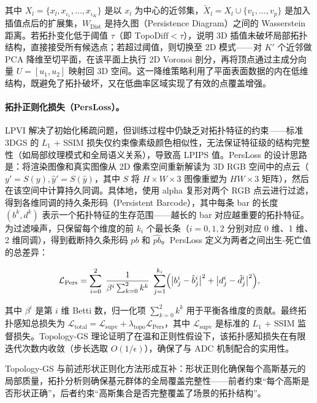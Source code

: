 其中 $X_l = \{x_l, x_{\iota_1}, \ldots, x_{\iota_K}\}$ 是以 $x_l$ 为中心的近邻集，$\tilde{X}_l = X_l \cup \{v_1, \ldots, v_p\}$ 是加入插值点后的扩展集，$W_{\mathrm{Dist}}$ 是持久图（Persistence Diagram）之间的 Wasserstein 距离。若拓扑变化低于阈值 $\tau$（即 $\mathrm{TopoDiff} < \tau$），说明 3D 插值未破坏局部拓扑结构，直接接受所有候选点；若超过阈值，则切换至 2D 模式——对 $K'$ 个近邻做 PCA 降维至切平面，在该平面上执行 2D Voronoi 剖分，再将顶点通过主成分向量 $U = [u_1, u_2]$ 映射回 3D 空间。这一降维策略利用了平面表面数据的内在低维结构，既避免了拓扑破坏，又在低曲率区域实现了有效的点覆盖增强。

\paragraph{拓扑正则化损失（PersLoss）。}LPVI 解决了初始化稀疏问题，但训练过程中仍缺乏对拓扑特征的约束——标准 3DGS 的 $L_1$ + SSIM 损失仅约束像素级颜色相似性，无法保证特征级的结构完整性（如局部纹理模式和全局语义关系），导致高 LPIPS 值。PersLoss 的设计思路是：将渲染图像和真实图像从 2D 像素空间重新解读为 3D RGB 空间中的点云（$y' = S(y), \hat{y}' = S(\hat{y})$，其中 $S$ 将 $H \times W \times 3$ 图像重塑为 $HW \times 3$ 矩阵），然后在该空间中计算持久同调。具体地，使用 alpha 复形对两个 RGB 点云进行过滤，得到各维同调的持久条形码（Persistent Barcode），其中每条 bar 的长度 $(b^k, d^k)$ 表示一个拓扑特征的生存范围——越长的 bar 对应越重要的拓扑特征。为过滤噪声，只保留每个维度的前 $k_i$ 个最长条（$i = 0, 1, 2$ 分别对应 0 维、1 维、2 维同调），得到截断持久条形码 $pb$ 和 $\hat{pb}$。PersLoss 定义为两者之间出生-死亡值的总差异：

\begin{equation}
\mathcal{L}_{\mathrm{Pers}} = \sum_{i=0}^{2}\;\frac{1}{\beta^i \sum_{k=0}^{2} k^k}\;\sum_{j=1}^{k_i}\Bigl(\bigl|b^i_j - \hat{b}^i_j\bigr|^2 + \bigl|d^i_j - \hat{d}^i_j\bigr|^2\Bigr),
\label{eq:02_persloss}
\end{equation}

其中 $\beta^i$ 是第 $i$ 维 Betti 数，归一化项 $\sum_{k=0}^{2} k^k$ 用于平衡各维度的贡献。最终拓扑感知总损失为 $\mathcal{L}_{\mathrm{total}} = \mathcal{L}_{\mathrm{supv}} + \lambda_{\mathrm{topo}} \mathcal{L}_{\mathrm{Pers}}$，其中 $\mathcal{L}_{\mathrm{supv}}$ 是标准的 $L_1$ + SSIM 监督损失。Topology-GS 理论证明了在温和正则性假设下，该拓扑感知损失在有限迭代次数内收敛（步长选取 $O(1/\epsilon)$），确保了与 ADC 机制配合的实用性。

Topology-GS 与前述形状正则化方法形成互补：形状正则化确保每个高斯基元的局部质量，拓扑分析则确保基元群体的全局覆盖完整性——前者约束“每个高斯是否形状正确”，后者约束“高斯集合是否完整覆盖了场景的拓扑结构”。

